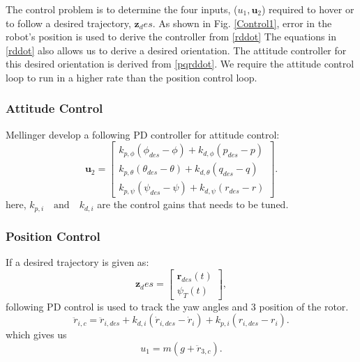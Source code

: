 \documentclass[conference,onecolumn,10pt]{IEEEtran}
\begin{document}
The control problem is to determine the four inputs, ($u_1, \textbf{u}_2$) required to hover or to follow a desired trajectory, $\textbf{z}_des$. As shown in Fig. \ref{Control1}, error in the robot's position is used to derive the controller from \eqref{rddot} The equations in \eqref{rddot} also allows us to derive a desired orientation. The attitude controller for this desired orientation is derived from \eqref{pqrddot}. We require the attitude control loop to run in a higher rate than the position control loop. 
\subsubsection{Attitude Control} 
Mellinger \cite{mellinger2011minimum} develop a following PD controller for attitude control:
\begin{equation}
\label{attitudeC}
\textbf{u}_2 = \begin{bmatrix}
k_{p,\phi}(\phi_{des} - \phi)+ k_{d,\phi}(p_{des}-p) \\
k_{p,\theta}(\theta_{des} - \theta)+ k_{d,\theta}(q_{des}-q) \\
k_{p,\psi}(\psi_{des} - \psi)+ k_{d,\psi}(r_{des}-r)
\end{bmatrix}.
\end{equation}
here, $k_{p,i} \quad \text{and} \quad k_{d,i}$ are the control gains that needs to be tuned.
\subsubsection{Position Control} 
If a desired trajectory is given as: $$\textbf{z}_des = \begin{bmatrix}
\textbf{r}_{des}(t) \\
\psi_T(t)
\end{bmatrix},$$
following PD control is used to track  the yaw angles and 3 position of the rotor. 
\begin{equation}
\ddot{r}_{i,c} = \ddot{r}_{i,des} + k_{d,i}(\dot{r}_{i,des} - \dot{r}_i ) + k_{p,i}(r_{i,des}-r_i).
\end{equation}
which gives us 
\begin{equation}
\label{desddt}
u_1 = m(g+\ddot{r}_{3,c}).
\end{equation}
\end{document}

